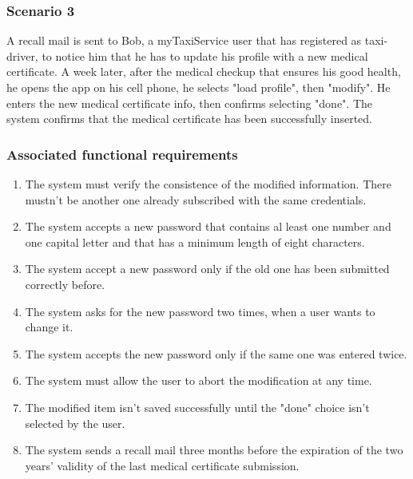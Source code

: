 \subsubsection{Scenario 3}
A recall mail is sent to Bob, a myTaxiService user that has registered as taxi-driver, to notice him that he has to update his profile with a new medical certificate. A week later, after the medical checkup that ensures his good health, he opens the app on his cell phone, he selects "load profile", then "modify". He enters the new medical certificate info, then confirms selecting "done". The system confirms that the medical certificate has been successfully inserted.

\subsubsection{Associated functional requirements}
\begin{enumerate}
\item The system must verify the consistence of the modified information. There mustn't be another one already subscribed with the same credentials. %
\item The system accepts a new password that contains al least one number and one capital letter and that has a minimum length of eight characters.
\item The system accept a new password only if the old one has been submitted correctly before.
\item The system asks for the new password two times, when a user wants to change it.
\item The system accepts the new password only if the same one was entered twice.
\item The system must allow the user to abort the modification at any time.
\item The modified item isn't saved successfully until the "done" choice isn't selected by the user. %
\item The system sends a recall mail three months before the expiration of the two years' validity of the last medical certificate submission.
\end{enumerate}




